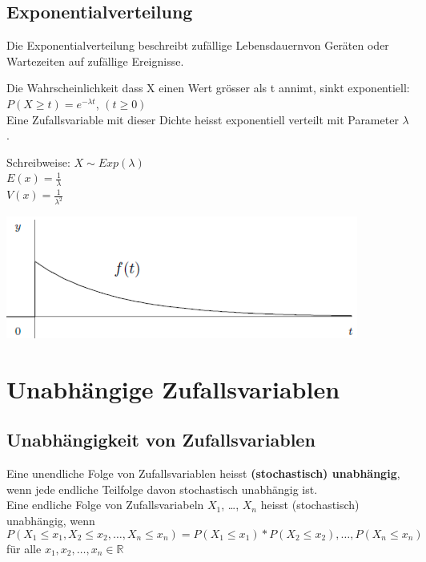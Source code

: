 \documentclass[10pt]{article}
\newtheorem[M]{definition}{Def.}
\newtheorem[M]{satz}{Satz}
\numberwithin{equation}{section}
\newcommand{\RN}{\mathbb{R}} %
\begin{document}
\subsection{Exponentialverteilung}
Die Exponentialverteilung beschreibt zufällige Lebensdauernvon Geräten oder Wartezeiten auf zufällige Ereignisse.
\begin{definition}[Exponentialerteilung]
Die Wahrscheinlichkeit dass X einen Wert grösser als t annimt, sinkt exponentiell: $P(X \geq t) = e^{-\lambda t}$, $(t \geq 0)$ \\
Eine Zufallsvariable mit dieser Dichte heisst exponentiell verteilt mit Parameter $\lambda$.
\end{definition}
Schreibweise: $X \sim Exp(\lambda)$ \\
$E(x) = \frac{1}{\lambda}$ \\
$V(x) = \frac{1}{\lambda^2}$
\begin{center}
	\includegraphics[scale=0.3]{exponentialverteilung.png}
\end{center}


\newpage
\section{Unabhängige Zufallsvariablen}
\subsection{Unabhängigkeit von Zufallsvariablen}
\begin{definition}
Eine unendliche Folge von Zufallsvariablen heisst \textbf{(stochastisch) unabhängig}, wenn jede endliche Teilfolge davon stochastisch unabhängig ist. \\
Eine endliche Folge von Zufallsvariabeln $X_1$, \dots, $X_n$ heisst (stochastisch) unabhängig, wenn 
\begin{equation}
P(X_1 \leq x_1, X_2 \leq x_2, \dots, X_n \leq x_n) = P(X_1 \leq x_1) * P(X_2 \leq x_2), \dots, P(X_n \leq x_n)
\end{equation}
für alle $x_1, x_2, \dots, x_n \in \RN$
\end{definition}
\end{document}
